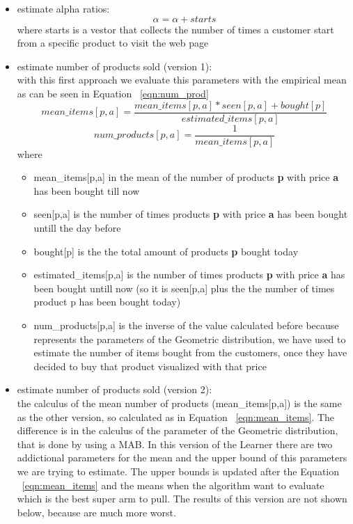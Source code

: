 \begin{itemize}
    \item estimate alpha ratios:\begin{equation}
        \label{eqn:alpha}
        \alpha = \alpha + starts
    \end{equation}where starts is a vestor that collects the number of times a customer start from a specific product to visit the web page
    \item estimate number of products sold (version 1):\\
    with this first approach we evaluate this parameters with the empirical mean as can be seen in Equation ~\ref{eqn:num_prod} \begin{equation}
        \label{eqn:mean_items}
        mean\_items[p,a] = \frac{mean\_items[p,a] * seen[p,a] + bought[p]}{estimated\_items[p,a]}
    \end{equation}\begin{equation}
        \label{eqn:num_prod}
        num\_products[p,a] = \frac{1}{mean\_items[p,a]}
    \end{equation}where\begin{itemize}
        \item mean\_items[p,a] in the mean of the number of products {\bf p} with price {\bf a} has been bought till now
        \item seen[p,a] is the number of times products {\bf p} with price {\bf a} has been bought untill the day before
        \item bought[p] is the the total amount of products {\bf p} bought today
        \item estimated\_items[p,a] is the number of times products {\bf p} with price {\bf a} has been bought untill now (so it is seen[p,a] plus the the number of times product p has been bought today)
        \item num\_products[p,a] is the inverse of the value calculated before because represents the parameters of the Geometric distribution, we have used to estimate the number of items bought from the customers, once they have decided to buy that product visualized with that price
    \end{itemize}
    \item estimate number of products sold (version 2):\\
    the calculus of the mean number of products (mean\_items[p,a]) is the same as the other version, so calculated as in Equation ~\ref{eqn:mean_items}. The difference is in the calculus of the parameter of the Geometric distribution, that is done by using a MAB. In this version of the Learner there are two addictional parameters for the mean and the upper bound of this parameters we are trying to estimate. The upper bounds is updated after the Equation ~\ref{eqn:mean_items} and the means when the algorithm want to evaluate which is the best super arm to pull. The results of this version are not shown below, because are much more worst.
\end{itemize}
